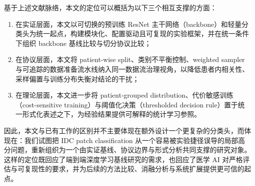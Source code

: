 基于上述文献脉络，本文的定位可以概括为以下三个相互支撑的方面：
\begin{enumerate}
    \item 在实证层面，本文以可切换的预训练 ResNet 主干网络（backbone）和轻量分类头为统一起点，构建模块化、配置驱动且可复现的实验框架，并在统一条件下组织 backbone 基线比较与切分协议比较；
    \item 在协议层面，本文将 patient-wise split、类别不平衡控制、weighted sampler 与可追踪的数据准备流水线纳入同一数据流治理视角，以降低患者内相关性、采样偏置与训练分布失衡对结论的干扰；
    \item 在理论层面，本文进一步将 patient-grouped distribution、代价敏感训练（cost-sensitive training）与阈值化决策（thresholded decision rule）置于统一形式化表述之下，为经验结果提供可解释的统计学习参照。
\end{enumerate}

因此，本文与已有工作的区别并不主要体现在额外设计一个更复杂的分类头，而体现在：我们试图把 IDC patch classification 从一个容易被实验捷径误导的局部高分问题，重新组织为一个由实证基线、协议边界与形式分析共同支撑的研究对象。这样的定位既回应了端到端深度学习基线研究的需求，也回应了医学 AI 对严格评估与可复现性的要求，并为后续的方法比较、消融分析与系统扩展提供更可信的起点。
